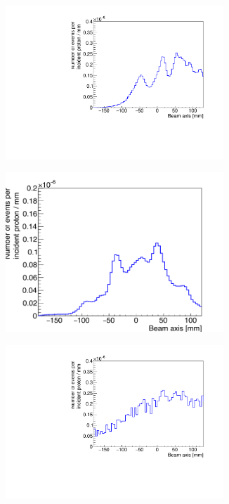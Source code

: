 \begin{figure}
\begin{subfigure}[b]{.5\textwidth}
\includegraphics[width=0.9\textwidth]{03_GraphicFiles/chapter4_HTsimu/new/profile_MLEM_200pBunch.pdf}
\caption{}
\label{chap4::fig::1Drecon_MLEM_200p}
\end{subfigure}
\begin{subfigure}[b]{.5\textwidth}
\centering
\includegraphics[width=0.9\textwidth]{03_GraphicFiles/chapter4_HTsimu/new/reconstructed_lowStat_profile_norm_mod.png}
\caption{}
\label{chap4::fig::1Drecon_MLEM_1p}
\end{subfigure}
\begin{subfigure}[b]{.5\textwidth}
\centering
\includegraphics[width=0.9\textwidth]{03_GraphicFiles/chapter4_HTsimu/new/profile_lineCone_200pBunch.pdf}

\end{subfigure}
\end{figure}
